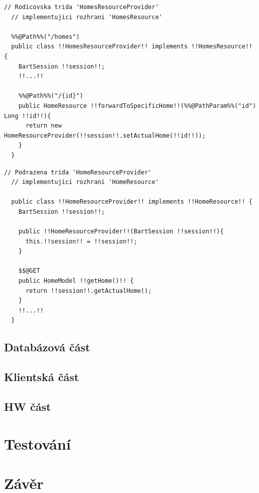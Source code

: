 \begin{lstlisting}[caption={Ukázka přesměrování požadavku}]
  // Rodicovska trida 'HomesResourceProvider'
  // implementujici rozhrani 'HomesResource'

  %%@Path%%("/homes")
  public class !!HomesResourceProvider!! implements !!HomesResource!! {
    BartSession !!session!!;
    !!...!!

    %%@Path%%("/{id}")
    public HomeResource !!forwardToSpecificHome!!(%%@PathParam%%("id") Long !!id!!){
      return new HomeResourceProvider(!!session!!.setActualHome(!!id!!));
    }
  }
\end{lstlisting}

\begin{lstlisting}[caption={Ukázka zpracování požadavku z přesměrované třídy}]
  // Podrazena trida 'HomeResourceProvider'
  // implementujici rozhrani 'HomeResource'

  public class !!HomeResourceProvider!! implements !!HomeResource!! {
    BartSession !!session!!;

    public !!HomeResourceProvider!!(BartSession !!session!!){
      this.!!session!! = !!session!!;
    }

    $$@GET
    public HomeModel !!getHome()!! {
      return !!session!!.getActualHome();
    }
    !!...!!
  }
\end{lstlisting}

\section{Databázová část}
\label{impl:databaze}


\section{Klientská část}
\label{impl:frontend}

\section{HW část}
\label{impl:hw}


\chapter{Testování}
\label{testovani}

\chapter{Závěr}
\label{zaver}